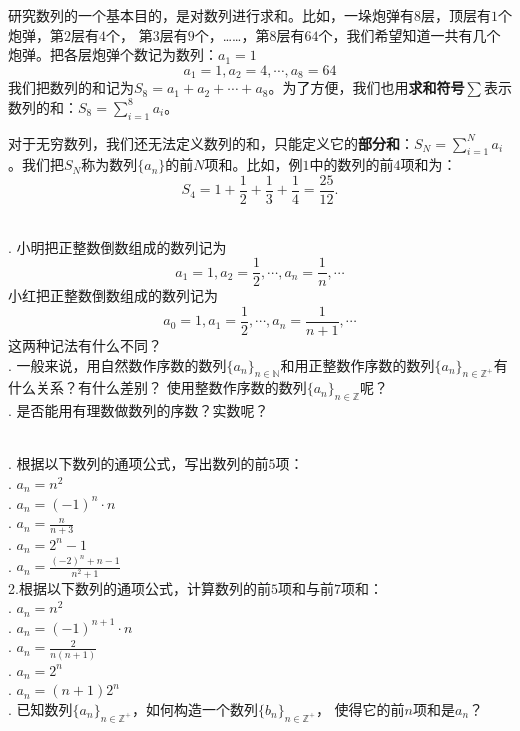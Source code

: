 \documentclass[12pt,UTF8,fontset=none]{ctexbook}
\begin{document}
研究数列的一个基本目的，是对数列进行求和。比如，一垛炮弹有$8$层，顶层有$1$个炮弹，第$2$层有$4$个，
第$3$层有$9$个，……，第$8$层有$64$个，我们希望知道一共有几个炮弹。把各层炮弹个数记为数列：$a_1 = 1$
$$ a_1 = 1, a_2 = 4, \cdots, a_8 = 64 $$
我们把数列的和记为$S_8 = a_1 + a_2 + \cdots + a_8$。为了方便，我们也用\textbf{求和符号}$\sum$表示数列的和：$S_8 = \sum_{i=1}^8 a_i$。

对于无穷数列，我们还无法定义数列的和，只能定义它的\textbf{部分和}：$S_N = \sum_{i=1}^N a_i$。我们把$S_N$称为数列$\{a_n\}$的前$N$项和。比如，例$1$中的数列的前$4$项和为：
$$ S_4 = 1 + \frac{1}{2} + \frac{1}{3} + \frac{1}{4} =  \frac{25}{12}. $$

\begin{sk}
    \mbox{}\\
    . 小明把正整数倒数组成的数列记为
    $$a_1 = 1, a_2 = \frac12, \cdots, a_n = \frac1n, \cdots$$
    \indent 小红把正整数倒数组成的数列记为
    $$a_0 = 1, a_1 = \frac12, \cdots, a_n = \frac{1}{n+1}, \cdots$$
    \indent 这两种记法有什么不同？\\
    . 一般来说，用自然数作序数的数列$\{a_n\}_{n\in\mathbb{N}}$和用正整数作序数的数列$\{a_n\}_{n\in\mathbb{Z}^+}$有什么关系？有什么差别？
    使用整数作序数的数列$\{a_n\}_{n\in\mathbb{Z}}$呢？\\
    . 是否能用有理数做数列的序数？实数呢？    
\end{sk}

\begin{xt}
    \mbox{}\\
. 根据以下数列的通项公式，写出数列的前$5$项：\\
. $a_n = n^2$ \\
. $a_n = (-1)^n \cdot n$ \\
. $a_n = \frac{n}{n+3}$ \\
. $a_n = 2^n - 1$ \\
. $a_n = \frac{(-2)^n + n - 1}{n^2 + 1}$ \\
\indent 2.根据以下数列的通项公式，计算数列的前$5$项和与前$7$项和： \\
. $a_n = n^2$ \\
. $a_n = (-1)^{n+1} \cdot n$ \\
. $a_n = \frac{2}{n(n+1)}$ \\
. $a_n = 2^n$ \\
. $a_n = (n+1)2^{n}$ \\
. 已知数列$\{a_n\}_{n\in\mathbb{Z}^+}$，如何构造一个数列$\{b_n\}_{n\in\mathbb{Z}^+}$，
使得它的前$n$项和是$a_n$？
\end{xt}
\end{document}
